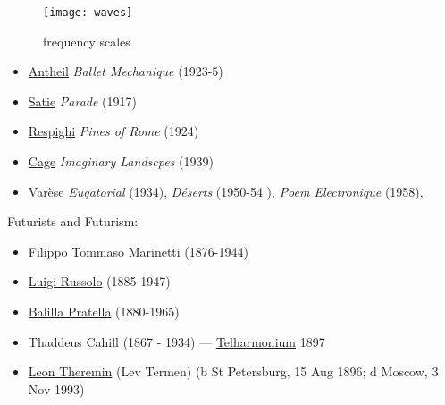 \begin{figure}[H]
\centering
\texttt{[image: waves]}\caption{frequency scales}
\label{fig:waves to frequencies}
\end{figure}

\begin{itemize}
\item \href{http://www.grovemusic.com/shared/views/article.html?from=search&session_search_id=1013431856&session_name=f64e02b451f7a922&hitnum=1&section=music.00997&start=1&query=antheil&search_subview=search_subject}{Antheil} \textit{Ballet Mechanique} (1923-5)
\item \href{http://www.grovemusic.com/shared/views/article.html?from=search&session_search_id=1013432477&session_name=f64e02b451f7a922&hitnum=1&section=music.40105&start=1&query=satie&search_subview=search_subject}{Satie} \textit{Parade} (1917)
\item \href{http://www.grovemusic.com/shared/views/article.html?section=music.47335}{Respighi} \textit{Pines of Rome} (1924)
\item \href{http://www.grovemusic.com/shared/views/article.html?section=music.49908}{Cage} \textit{Imaginary Landscpes} (1939)
\item \href{http://www.grovemusic.com/shared/views/article.html?section=music.29042}{Var\`ese} \textit{Euqatorial} (1934), \textit{D\'eserts} (1950-54 ), \textit{Poem Electronique} (1958),
\end{itemize}


Futurists and Futurism:
\begin{itemize}
\item Filippo Tommaso Marinetti (1876-1944)
\item \href{http://www.grovemusic.com/shared/views/article.html?section=music.24174}{Luigi Russolo} (1885-1947)
\item \href{http://www.grovemusic.com/shared/views/article.html?from=search&session_search_id=1013432510&session_name=f64e02b451f7a922&hitnum=4&section=music.22259&start=1&query=marinetti&search_subview=search_subject}{Balilla Pratella} (1880-1965)
\end{itemize}

\begin{itemize}
\item Thaddeus Cahill (1867 - 1934) --- \href{http://www.grovemusic.com/shared/views/article.html?section=music.46183}{Telharmonium} 1897
\item \href{http://www.grovemusic.com/shared/views/article.html?section=music.45834}{Leon Theremin} (Lev Termen) (b St Petersburg, 15 Aug 1896; d Moscow, 3 Nov 1993)
\end{itemize}

